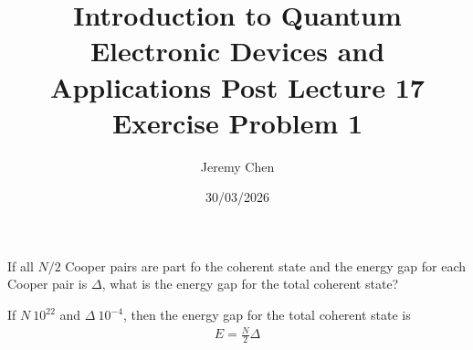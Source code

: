 \documentclass[10pt,letterpaper]{article}
\title{Introduction to Quantum Electronic Devices and Applications Post Lecture 17 Exercise Problem 1}
\author{Jeremy Chen}
\date{30/03/2026}
\begin{document}
	\maketitle

\noindent If all $N / 2$ Cooper pairs are part fo the coherent state and the energy gap for each Cooper pair is $\Delta$, what is the energy gap for the total coherent state?

\color{violet}
If $N ~ 10^{22}$ and $\Delta ~ 10^{-4}$, then the energy gap for the total coherent state is
\begin{gather*}
E = \frac{N}{2}\Delta
\end{gather*}
\color{black}
\end{document}
